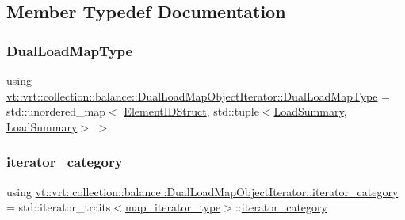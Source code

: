 \subsection{Member Typedef Documentation}
\mbox{\label{structvt_1_1vrt_1_1collection_1_1balance_1_1_dual_load_map_object_iterator_a283605916dbc414bbc6e176b9f3fb240}} 
\subsubsection{\texorpdfstring{Dual\+Load\+Map\+Type}{DualLoadMapType}}
{\footnotesize\ttfamily using \hyperlink{structvt_1_1vrt_1_1collection_1_1balance_1_1_dual_load_map_object_iterator_a283605916dbc414bbc6e176b9f3fb240}{vt\+::vrt\+::collection\+::balance\+::\+Dual\+Load\+Map\+Object\+Iterator\+::\+Dual\+Load\+Map\+Type} =  std\+::unordered\+\_\+map$<$ \hyperlink{namespacevt_1_1vrt_1_1collection_1_1balance_a9f5b53fafb270212279a4757d2c4cd28}{Element\+I\+D\+Struct}, std\+::tuple$<$\hyperlink{structvt_1_1vrt_1_1collection_1_1balance_1_1_load_summary}{Load\+Summary}, \hyperlink{structvt_1_1vrt_1_1collection_1_1balance_1_1_load_summary}{Load\+Summary}$>$ $>$}

\mbox{\label{structvt_1_1vrt_1_1collection_1_1balance_1_1_dual_load_map_object_iterator_a34d41afa8def298d663b106eee78dddf}} 
\subsubsection{\texorpdfstring{iterator\+\_\+category}{iterator\_category}}
{\footnotesize\ttfamily using \hyperlink{structvt_1_1vrt_1_1collection_1_1balance_1_1_dual_load_map_object_iterator_a34d41afa8def298d663b106eee78dddf}{vt\+::vrt\+::collection\+::balance\+::\+Dual\+Load\+Map\+Object\+Iterator\+::iterator\+\_\+category} =  std\+::iterator\+\_\+traits$<$\hyperlink{structvt_1_1vrt_1_1collection_1_1balance_1_1_dual_load_map_object_iterator_a86bac54b4dc71af6b0a7cf5aa7ced433}{map\+\_\+iterator\+\_\+type}$>$\+::\hyperlink{structvt_1_1vrt_1_1collection_1_1balance_1_1_dual_load_map_object_iterator_a34d41afa8def298d663b106eee78dddf}{iterator\+\_\+category}}

